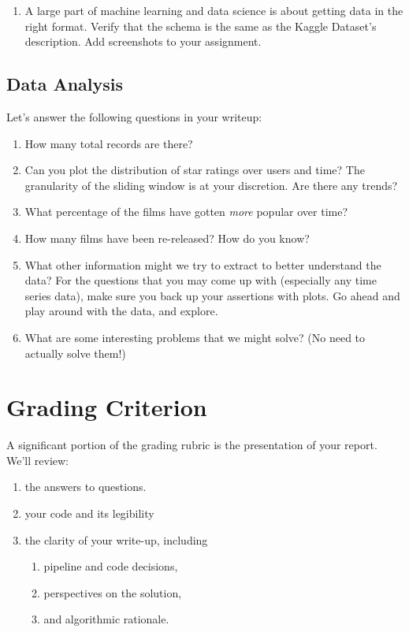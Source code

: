 \documentclass[paper=a4, fontsize=11pt]{scrartcl} %
\numberwithin{equation}{section} %
\numberwithin{figure}{section} %
\numberwithin{table}{section} %
\begin{document}
\noindent
\begin{enumerate}
\item A large part of machine learning and data science is about getting data in the right format. Verify that the schema is the same as the Kaggle Dataset's description. Add screenshots to your assignment.
\end{enumerate}


\subsection{Data Analysis}
\label{sec:data-analysis}

Let's answer the following questions in your writeup: 

\begin{enumerate}
    \item How many total records are there?
    \item Can you plot the distribution of star ratings over users and time? The granularity of the sliding window is at your discretion. Are there any trends?
    \item What percentage of the films have gotten \emph{more} popular over time?
    \item How many films have been re-released? How do you know?
    \item What other information might we try to extract to better understand the data? For the questions that you may come up with (especially any time series data), make sure you back up your assertions with plots. Go ahead and play around with the data, and explore. 
    \item What are some interesting problems that we might solve? (No need to actually solve them!)
\end{enumerate}

\section{Grading Criterion}

A significant portion of the grading rubric is the presentation of your report. We'll review:

\begin{enumerate}
    \item the answers to questions.
    \item your code and its legibility
    \item the clarity of your write-up, including 
    \begin{enumerate}
      \item pipeline and code decisions, 
      \item perspectives on the solution, 
      \item and algorithmic rationale.
    \end{enumerate}
\end{enumerate}
\end{document}
